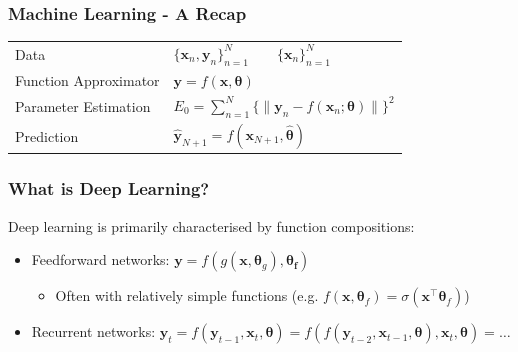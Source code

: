 \documentclass[]{article}
\begin{document}
\begin{frame}
\frametitle{Machine Learning - A Recap}
\vspace{5mm}
\begin{tabular}{ll}
Data & $\{\bm{x}_n, \bm{y}_n\}^N_{n=1} \qquad \{\bm{x}_n\}^N_{n=1}$
\vspace{3mm} \\ \pause
Function Approximator & $\bm{y} = f (\bm{x}, \bm{\theta})$ %
\vspace{3mm} \\ \pause
Parameter Estimation & $E_0 = \sum^N_{n=1} \{\|\bm{y}_n - f (\bm{x}_n; \bm{\theta})\|\}^2$
\vspace{3mm} \\ \pause
Prediction & $\bm{\hat y}_{N+1} = f(\bm{x}_{N+1}, \bm{\hat \theta})$
\end{tabular}
\vspace{5mm}
\end{frame}

\begin{frame}
\frametitle{What is Deep Learning?}

Deep learning is primarily characterised by function compositions: \\ \vspace{10mm}
\begin{itemize}
	\item<2-> Feedforward networks: $\bm{y} = f (g(\bm{x}, \bm\theta_g), \bm{\theta_f})$
	\begin{itemize}
		\item Often with relatively simple functions (e.g. $f(\bm x, \bm{\theta}_f) = \sigma(\bm{x}^\top \bm{\theta}_f)$)
	\end{itemize} \vspace{3mm}
	\item<3-> Recurrent networks: $\bm y_t = f(\bm y_{t-1}, \bm x_t, \bm\theta) = f(f(\bm y_{t-2}, \bm x_{t-1}, \bm\theta), \bm x_t, \bm\theta) = \dots$
\end{itemize}
\vspace{10mm}

\end{frame}
\end{document}
